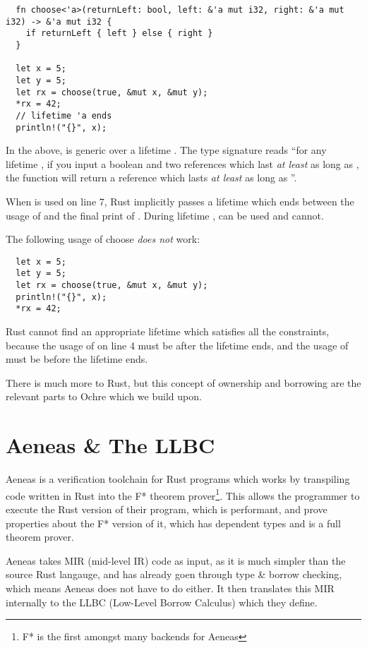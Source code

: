 \documentclass[12pt,twoside]{report}
\begin{document}
\begin{verbatim}
  fn choose<'a>(returnLeft: bool, left: &'a mut i32, right: &'a mut i32) -> &'a mut i32 {
    if returnLeft { left } else { right }
  }

  let x = 5;
  let y = 5;
  let rx = choose(true, &mut x, &mut y);
  *rx = 42;
  // lifetime 'a ends
  println!("{}", x);
\end{verbatim}

In the above,  is generic over a lifetime . The type signature reads ``for any lifetime , if you input a boolean and two references which last \textit{at least} as long as , the function will return a reference which lasts \textit{at least} as long as ''.

When  is used on line 7, Rust implicitly passes a lifetime which ends between the usage of  and the final print of . During lifetime ,  can be used and  cannot.

The following usage of choose \textit{does not} work:

\begin{verbatim}
  let x = 5;
  let y = 5;
  let rx = choose(true, &mut x, &mut y);
  println!("{}", x);
  *rx = 42;
\end{verbatim}

Rust cannot find an appropriate lifetime which satisfies all the constraints, because the usage of  on line 4 must be after the lifetime ends, and the usage of  must be before the lifetime ends.

There is much more to Rust, but this concept of ownership and borrowing are the relevant parts to Ochre which we build upon.

\section{Aeneas \& The LLBC}
Aeneas \citep{aeneas} is a verification toolchain for Rust programs which works by transpiling code written in Rust into the F* theorem prover\footnote{F* is the first amongst many backends for Aeneas}. This allows the programmer to execute the Rust version of their program, which is performant, and prove properties about the F* version of it, which has dependent types and is a full theorem prover.

Aeneas takes MIR (mid-level IR) code as input, as it is much simpler than the source Rust langauge, and has already goen through type \& borrow checking, which means Aeneas does not have to do either. It then translates this MIR internally to the LLBC (Low-Level Borrow Calculus) which they define.
\end{document}
